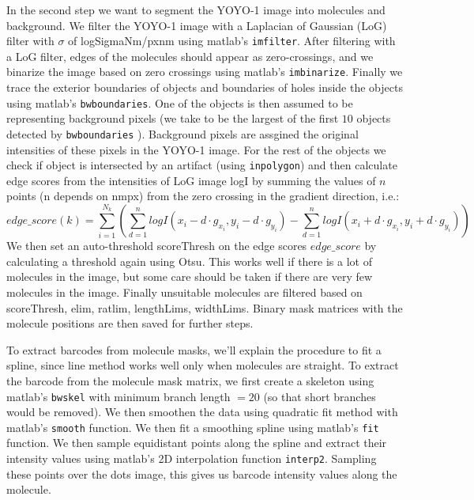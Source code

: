 \documentclass{article}
\begin{document}
In the second step we want to segment the YOYO-1 image into molecules and background. We filter the YOYO-1 image with a Laplacian of Gaussian (LoG) filter with $\sigma$ of logSigmaNm/pxnm using matlab's \texttt{imfilter}. After filtering with a LoG filter, edges of the molecules should appear as zero-crossings, and we binarize the image based on zero crossings using matlab's \texttt{imbinarize}. Finally we trace the exterior boundaries of objects and boundaries of holes inside the objects using matlab's \texttt{bwboundaries}. One of the objects is then assumed to be representing background pixels (we take to be the largest of the first $10$ objects detected by \texttt{bwboundaries} ). Background pixels are assgined the original intensities of these pixels in the YOYO-1 image. For the rest of the objects we check if object is intersected by an artifact (using \texttt{inpolygon}) and then calculate edge scores from the intensities of LoG image logI by summing the values of $n$ points (n depends on nmpx) from the zero crossing in the gradient direction, i.e.:
%
\begin{equation}
	edge\_score(k)= \sum_{i=1}^{N_k} \left( \sum_{d=1}^n logI(x_i-d\cdot g_{x_i},y_i-d\cdot g_{y_i}) -  \sum_{d=1}^n logI(x_i+d\cdot g_{x_i},y_i+d\cdot g_{y_i})\right)
\end{equation}
%
We then set an auto-threshold {\rm scoreThresh} on the edge scores $edge\_score$ by calculating a threshold again using Otsu. This works well if there is a lot of molecules in the image, but some care should be taken if there are very few molecules in the image. Finally unsuitable  molecules are filtered based on  {\rm scoreThresh, elim, ratlim, lengthLims, widthLims}. Binary mask matrices with the molecule positions are then saved for further steps.


To extract barcodes from molecule masks, we'll explain the procedure to fit a spline,  since line method works well only when molecules are straight. To extract the barcode from the molecule mask matrix, we first create a skeleton using matlab's \texttt{bwskel} with minimum branch length $=20$ (so that short branches would be removed). We then smoothen the data using quadratic fit method with matlab's \texttt{smooth} function. We then fit a smoothing spline using matlab's \texttt{fit} function. We then sample equidistant points along the spline and extract their intensity values using matlab's 2D interpolation function \texttt{interp2}. Sampling these points over the dots image, this gives us barcode intensity values along the molecule.
\end{document}
